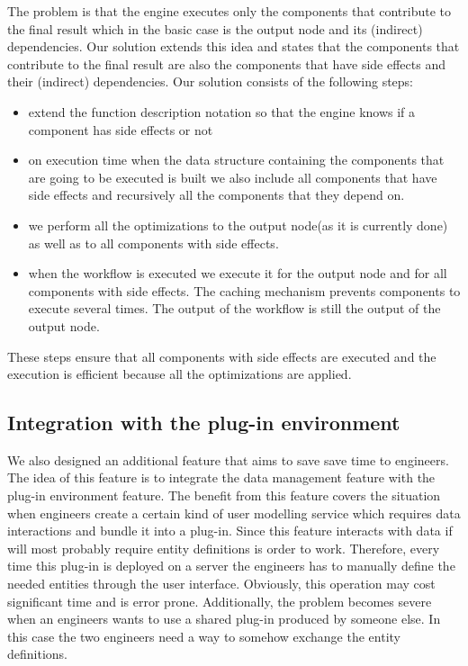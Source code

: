 The problem is that the engine executes only the components that contribute to the final result which in the basic case is the output node and its (indirect) dependencies. Our solution extends this idea and states that the components that contribute to the final result are also the components that have side effects and their (indirect) dependencies. Our solution consists of the following steps:

\begin{itemize}
	\item extend the function description notation so that the engine knows if a component has side effects or not
	\item on execution time when the data structure containing the components that are going to be executed is built we also include all components that have side effects and recursively all the components that they depend on.
	\item we perform all the optimizations to the output node(as it is currently done) as well as to all components with side effects. 
	\item when the workflow is executed we execute it for the output node and for all components with side effects. The caching mechanism prevents components to execute several times. The output of the workflow is still the output of the output node.
\end{itemize}

These steps ensure that all components with side effects are executed and the execution is efficient because all the optimizations are applied.

\subsection{Integration with the plug-in environment}

We also designed an additional feature that aims to save save time to engineers. The idea of this feature is to integrate the data management feature with the plug-in environment feature. The benefit from this feature covers the situation when engineers create a certain kind of user modelling service which requires data interactions and  bundle it into a plug-in. Since this feature interacts with data if will most probably require entity definitions is order to work. Therefore, every time this plug-in is deployed on a server the engineers has to manually define the needed entities through the user interface. Obviously, this operation may cost significant time and is error prone. Additionally, the problem becomes severe when an engineers wants to use a shared plug-in produced by someone else. In this case the two engineers need a way to somehow exchange the entity definitions.

